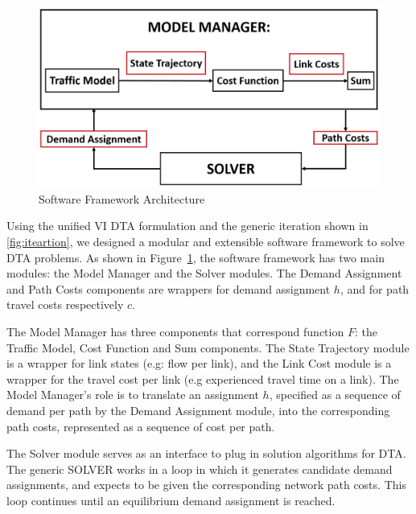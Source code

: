 \begin{figure}[h]
    \centering
    \includegraphics[width=\linewidth]{figs/Software_Block_Diagram.PNG}
    \caption{Software Framework Architecture}
    \label{fig:Block_Diagram}
\end{figure}

Using the unified VI DTA formulation and the generic iteration shown in \ref{fig:iteartion}, we designed a modular and extensible
software framework to solve DTA problems. As shown in Figure~\ref{fig:Block_Diagram}, the software framework has two main modules: the Model Manager and the Solver modules. The Demand Assignment and Path Costs components are wrappers for demand assignment $h$, and for path travel costs respectively $c$.

The Model Manager has three components that correspond function $F$: the Traffic Model, Cost Function and Sum components. The State Trajectory module is a wrapper for link states (e.g: flow per link), and the Link Cost module is a wrapper for the travel cost per link (e.g experienced travel time on a link). The Model Manager's role is to translate an assignment $h$, specified as a sequence of demand per path by the Demand Assignment module, into the corresponding path costs, represented as a sequence of cost per path.

The Solver module serves as an interface to plug in solution algorithms for DTA. The generic SOLVER works in a loop in which it generates candidate demand assignments, and expects to be given the corresponding network path costs. This loop continues until an equilibrium demand assignment is reached. 

